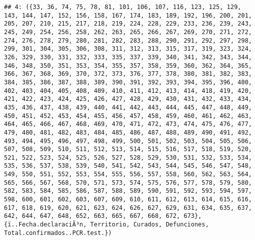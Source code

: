 \documentclass[
]{book}
\begin{document}
\begin{verbatim}
## 4: ({33, 36, 74, 75, 78, 81, 101, 106, 107, 116, 123, 125, 129, 143, 144, 147, 152, 156, 158, 167, 174, 183, 189, 192, 196, 200, 201, 205, 207, 210, 215, 217, 218, 219, 224, 228, 229, 233, 236, 239, 243, 245, 249, 254, 256, 258, 262, 263, 265, 266, 267, 269, 270, 271, 272, 274, 276, 278, 279, 280, 281, 282, 283, 288, 290, 291, 292, 297, 298, 299, 301, 304, 305, 306, 308, 311, 312, 313, 315, 317, 319, 323, 324, 326, 329, 330, 331, 332, 333, 335, 337, 339, 340, 341, 342, 343, 344, 346, 348, 350, 351, 353, 354, 355, 357, 358, 359, 360, 362, 364, 365, 366, 367, 368, 369, 370, 372, 373, 376, 377, 378, 380, 381, 382, 383, 384, 385, 386, 387, 388, 389, 390, 391, 392, 393, 394, 395, 396, 400, 402, 403, 404, 405, 408, 409, 410, 411, 412, 413, 414, 418, 419, 420, 421, 422, 423, 424, 425, 426, 427, 428, 429, 430, 431, 432, 433, 434, 435, 436, 437, 438, 439, 440, 441, 442, 443, 444, 445, 447, 448, 449, 450, 451, 452, 453, 454, 455, 456, 457, 458, 459, 460, 461, 462, 463, 464, 465, 466, 467, 468, 469, 470, 471, 472, 473, 474, 475, 476, 477, 479, 480, 481, 482, 483, 484, 485, 486, 487, 488, 489, 490, 491, 492, 493, 494, 495, 496, 497, 498, 499, 500, 501, 502, 503, 504, 505, 506, 507, 508, 509, 510, 511, 512, 513, 514, 515, 516, 517, 518, 519, 520, 521, 522, 523, 524, 525, 526, 527, 528, 529, 530, 531, 532, 533, 534, 535, 536, 537, 538, 539, 540, 541, 542, 543, 544, 545, 546, 547, 548, 549, 550, 551, 552, 553, 554, 555, 556, 557, 558, 560, 562, 563, 564, 565, 566, 567, 568, 570, 571, 573, 574, 575, 576, 577, 578, 579, 580, 582, 583, 584, 585, 586, 587, 588, 589, 590, 591, 592, 593, 594, 597, 598, 600, 601, 602, 603, 607, 609, 610, 611, 612, 613, 614, 615, 616, 617, 618, 619, 620, 621, 623, 624, 626, 627, 629, 631, 634, 635, 637, 642, 644, 647, 648, 652, 663, 665, 667, 668, 672, 673}, {ï..Fecha.declaraciÃ³n, Territorio, Curados, Defunciones, Total.confirmados..PCR.test.})

\end{verbatim}
\end{document}
